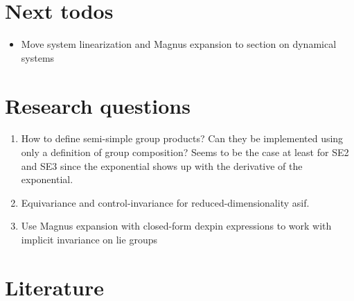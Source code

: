 

\section{Next todos}

\begin{itemize}
  \item Move system linearization and Magnus expansion to section on dynamical systems
\end{itemize}

\section{Research questions}

\begin{enumerate}
  \item How to define semi-simple group products? Can they be implemented using only a definition of group composition? Seems to be the case at least for SE2 and SE3 since the exponential shows up with the derivative of the exponential.
  \item Equivariance and control-invariance for reduced-dimensionality asif.
  \item Use Magnus expansion with closed-form dexpin expressions to work with implicit invariance on lie groups
\end{enumerate}


\section{Literature}

